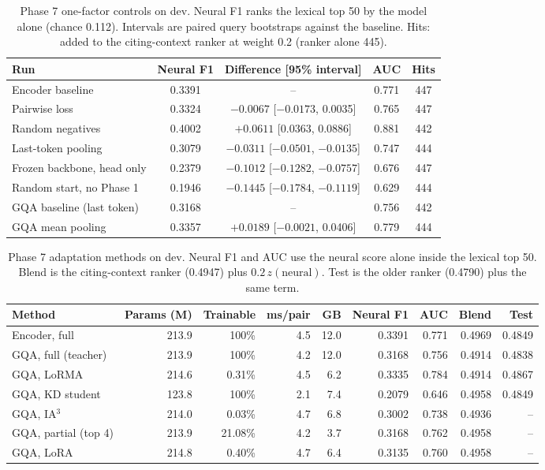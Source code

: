 \begin{table}[H]
\centering\small
\caption{Phase 7 one-factor controls on dev. Neural F1 ranks the lexical top 50 by the model alone (chance 0.112). Intervals are paired query bootstraps against the baseline. Hits: added to the citing-context ranker at weight 0.2 (ranker alone 445).}
\label{tab:p7controls}
\begin{tabular}{lcccc}
\toprule
Run & Neural F1 & Difference [95\% interval] & AUC & Hits \\
\midrule
Encoder baseline & 0.3391 & -- & 0.771 & 447 \\
Pairwise loss & 0.3324 & $-0.0067$ [$-0.0173$, 0.0035] & 0.765 & 447 \\
Random negatives & 0.4002 & $+0.0611$ [0.0363, 0.0886] & 0.881 & 442 \\
Last-token pooling & 0.3079 & $-0.0311$ [$-0.0501$, $-0.0135$] & 0.747 & 444 \\
Frozen backbone, head only & 0.2379 & $-0.1012$ [$-0.1282$, $-0.0757$] & 0.676 & 447 \\
Random start, no Phase 1 & 0.1946 & $-0.1445$ [$-0.1784$, $-0.1119$] & 0.629 & 444 \\
\midrule
GQA baseline (last token) & 0.3168 & -- & 0.756 & 442 \\
GQA mean pooling & 0.3357 & $+0.0189$ [$-0.0021$, 0.0406] & 0.779 & 444 \\
\bottomrule
\end{tabular}
\end{table}

\begin{table}[H]
\centering\small
\caption{Phase 7 adaptation methods on dev. Neural F1 and AUC use the neural score alone inside the lexical top 50. Blend is the citing-context ranker (0.4947) plus $0.2\,z(\text{neural})$. Test is the older ranker (0.4790) plus the same term.}
\label{tab:p7methods}
\begin{tabular}{lrrrrrrrr}
\toprule
Method & Params (M) & Trainable & ms/pair & GB & Neural F1 & AUC & Blend & Test \\
\midrule
Encoder, full & 213.9 & 100\% & 4.5 & 12.0 & 0.3391 & 0.771 & 0.4969 & 0.4849 \\
GQA, full (teacher) & 213.9 & 100\% & 4.2 & 12.0 & 0.3168 & 0.756 & 0.4914 & 0.4838 \\
GQA, LoRMA & 214.6 & 0.31\% & 4.5 & 6.2 & 0.3335 & 0.784 & 0.4914 & 0.4867 \\
GQA, KD student & 123.8 & 100\% & 2.1 & 7.4 & 0.2079 & 0.646 & 0.4958 & 0.4849 \\
GQA, IA$^3$ & 214.0 & 0.03\% & 4.7 & 6.8 & 0.3002 & 0.738 & 0.4936 & -- \\
GQA, partial (top 4) & 213.9 & 21.08\% & 4.2 & 3.7 & 0.3168 & 0.762 & 0.4958 & -- \\
GQA, LoRA & 214.8 & 0.40\% & 4.7 & 6.4 & 0.3135 & 0.760 & 0.4958 & -- \\
\bottomrule
\end{tabular}
\end{table}


